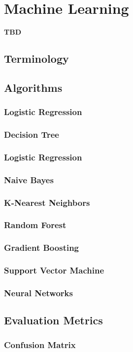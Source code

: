 \chapter{Machine Learning}
\label{chap:three}

\textbf{TBD}

\section{Terminology}
\section{Algorithms}
\subsection{Logistic Regression}
\subsection{Decision Tree}
\subsection{Logistic Regression}
\subsection{Naive Bayes}
\subsection{K-Nearest Neighbors}
\subsection{Random Forest}
\subsection{Gradient Boosting}
\subsection{Support Vector Machine}
\subsection{Neural Networks}
\section{Evaluation Metrics}
\subsection{Confusion Matrix}


